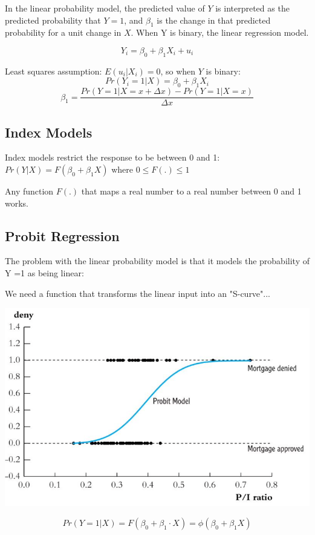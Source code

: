 \documentclass[a3paper, 8pt]{extarticle}
\begin{document}
\begin{multicols*}{5}
In the linear probability model, the predicted value of $Y$ is interpreted as the predicted probability that $Y=1$, and $\beta_1$ is the change in that predicted probability for a unit change in $X$. When Y is binary, the linear regression model.

$$Y_i = \beta_0 + \beta_1 X_i + u_i$$

Least squares assumption: $E(u_i | X_i)=0$, so when $Y$ is binary: %
$$Pr(Y_i=1 | X)= \beta_0 + \beta_1 X_i$$
$$\beta_1=\frac{Pr(Y=1|X=x+ \Delta x)-Pr(Y=1 | X=x)}{\Delta x}$$

\subsection{Index Models}

Index models restrict the response to be between 0 and 1: $Pr(Y|X)=F(\beta_0+\beta_1X)$ where $0 \leq F(.) \leq 1$

Any function $F(.)$ that maps a real number to a real number between 0 and 1 works.

\subsection{Probit Regression}

The problem with the linear probability model is that it models the probability of Y =1 as being linear:

We need a function that transforms the linear input into an "S-curve"...

\includegraphics[width= \columnwidth]{Screen Shot 2023-05-29 at 11.20.59.png}

$$Pr(Y=1|X)=F(\beta_0+\beta_1 \cdot X) = \phi (\beta_0 + \beta_1 X)$$


\end{multicols*}
\end{document}
